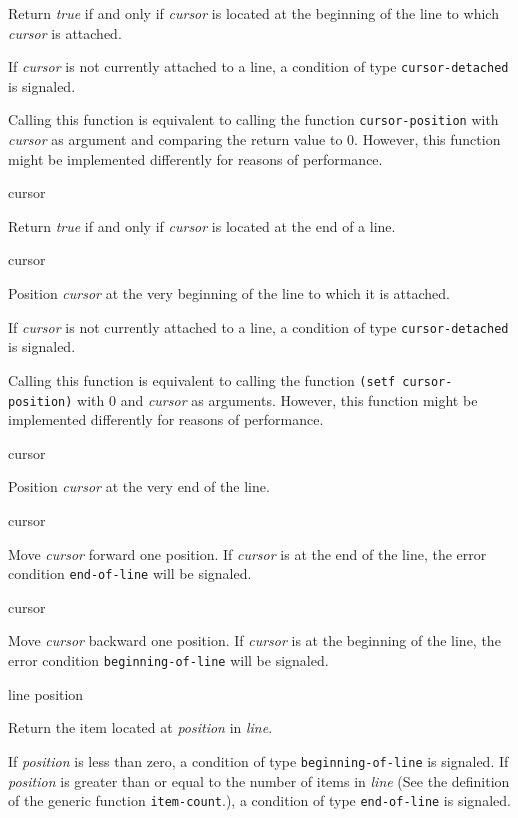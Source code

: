 Return \textit{true} if and only if \textit{cursor} is located at the
beginning of the line to which \textit{cursor} is attached.

If \textit{cursor} is not currently attached to a line, a condition
of type \texttt{cursor-detached} is signaled.

Calling this function is equivalent to calling the function
\texttt{cursor-position} with \textit{cursor} as argument and
comparing the return value to $0$.  However, this function might be
implemented differently for reasons of performance.

 {cursor}

Return \textit{true} if and only if \textit{cursor} is located at the
end of a line.

 {cursor}

Position \textit{cursor} at the very beginning of the line to which it
is attached.

If \textit{cursor} is not currently attached to a line, a condition
of type \texttt{cursor-detached} is signaled.

Calling this function is equivalent to calling the function
\texttt{(setf cursor-position)} with $0$ and \textit{cursor} as
arguments.  However, this function might be implemented differently
for reasons of performance.

 {cursor}

Position \textit{cursor} at the very end of the line.

 {cursor}

Move \textit{cursor} forward one position.  If \emph{cursor} is at the
end of the line, the error condition \texttt{end-of-line} will be
signaled.

 {cursor}

Move \textit{cursor} backward one position.  If \emph{cursor} is at
the beginning of the line, the error condition
\texttt{beginning-of-line} will be signaled.

 {line position}

Return the item located at \textit{position} in \textit{line}.

If \textit{position} is less than zero, a condition of type
\texttt{beginning-of-line} is signaled.  If \textit{position} is
greater than or equal to the number of items in \textit{line} (See the
definition of the generic function \texttt{item-count}.), a condition
of type \texttt{end-of-line} is signaled.

